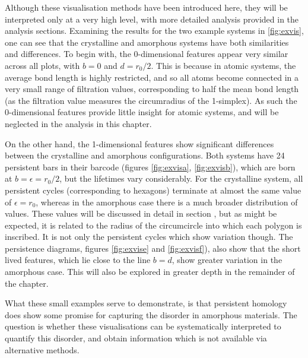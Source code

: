Although these visualisation methods have been introduced here, they will be interpreted only at a very high level, with more detailed analysis provided in the analysis sections.
Examining the results for the two example systems in \ref{fig:exvis}, one can see that the crystalline and amorphous systems have both similarities and differences.
To begin with, the 0\--dimensional features appear very similar across all plots, with $b=0$ and $d=r_0/2$.
This is because in atomic systems, the average bond length is highly restricted, and so all atoms become connected in a very small range of filtration values, corresponding to half the mean bond length (as the filtration value measures the circumradius of the 1\--simplex).
As such the $0$\--dimensional features provide little insight for atomic systems, and will be neglected in the analysis in this chapter.

On the other hand, the 1\--dimensional features show significant differences between the crystalline and amorphous configurations.
Both systems have 24 persistent bars in their barcode (figures \ref{fig:exvisa}, \ref{fig:exvisb}), which are born at $b=\epsilon=r_0/2$, but the lifetimes vary considerably. 
For the crystalline system, all persistent cycles (corresponding to hexagons) terminate at almost the same value of $\epsilon=r_0$, whereas in the amorphous case there is a much broader distribution of values.
These values will be discussed in detail in section , but as might be expected, it is related to the radius of the circumcircle into which each polygon is inscribed. 
It is not only the persistent cycles which show variation though.
The persistence diagrams, figures \ref{fig:exvise} and \ref{fig:exvisf}), also show that the short lived features, which lie close to the line $b=d$, show greater variation in the amorphous case.
This will also be explored in greater depth in the remainder of the chapter.

What these small examples serve to demonstrate, is that persistent homology does show some promise for capturing the disorder in amorphous materials.
The question is whether these visualisations can be systematically interpreted to quantify this disorder, and obtain information which is not available via alternative methods.

